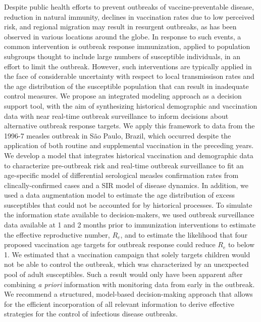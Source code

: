 Despite public health efforts to prevent outbreaks of vaccine-preventable disease, reduction in natural immunity, declines in vaccination rates due to low perceived risk, and regional migration may result in resurgent outbreaks, as has been observed in various locations around the globe. In response to such events, a common intervention is outbreak response immunization, applied to population subgroups thought to include large numbers of susceptible individuals, in an effort to limit the outbreak. However, such interventions are typically applied in the face of considerable uncertainty with respect to local transmissison rates and the age distribution of the susceptible population that can result in inadequate control measures. We propose an integrated modeling approach as a decision support tool, with the aim of synthesizing historical demographic and vaccination data with near real-time outbreak surveillance to inform decisions about alternative outbreak response targets. We apply this framework to data from the 1996-7 measles outbreak in S\~{a}o Paulo, Brazil, which occurred despite the application of both routine and supplemental vaccination in the preceding years. We develop a model that integrates historical vaccination and demographic data to characterize pre-outbreak risk and real-time outbreak surveillance to fit an age-specific model of differential serological measles confirmation rates from clincally-confirmed cases and a SIR model of disease dynamics.  In addition, we used a data augmentation model to estimate the age distribution of excess susceptibles that could not be accounted for by historical processes. To simulate the information state available to decision-makers, we used outbreak surveillance data available at 1 and 2 months prior to immunization interventions to estimate the effective reproductive number, \(R_e\), and to estimate the likelihood that four proposed vaccination age targets for outbreak response could reduce \(R_e\) to below 1.  We estimated that a vaccination campaign that solely targets children would not be able to control the outbreak, which was characterized by an unexpected pool of adult susceptibles. Such a result would only have been apparent after combining \textit{a priori} information with monitoring data from early in the outbreak. We recommend a structured, model-based decision-making approach that allows for the efficient incorporation of all relevant information to derive effective strategies for the control of infectious disease outbreaks.